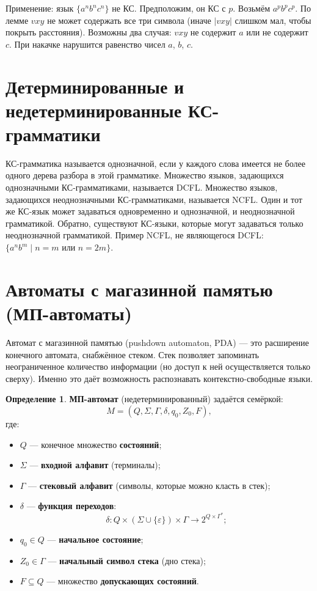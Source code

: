 \documentclass[12pt,a4paper]{article}
\theoremstyle{definition}
\newtheorem{definition}{Определение}[section]
\begin{document}
Применение: язык $\{a^n b^n c^n\}$ не КС. Предположим, он КС с $p$. Возьмём $a^p b^p c^p$. По лемме $vxy$ не может содержать все три символа (иначе $|vxy|$ слишком мал, чтобы покрыть расстояния). Возможны два случая: $vxy$ не содержит $a$ или не содержит $c$. При накачке нарушится равенство чисел $a$, $b$, $c$.

\section{Детерминированные и недетерминированные КС-грамматики}

КС-грамматика называется однозначной, если у каждого слова имеется не более одного дерева разбора в этой грамматике. Множество языков, задающихся однозначными КС-грамматиками, называется DCFL. Множество языков, задающихся неоднозначными КС-грамматиками, называется NCFL. Один и тот же КС-язык может задаваться одновременно и однозначной, и неоднозначной грамматикой. Обратно, существуют КС-языки, которые могут задаваться только неоднозначной грамматикой. Пример NCFL, не являющегося DCFL: $\{a^n b^m \mid n=m \text{ или } n=2m\}$.

\section{Автоматы с магазинной памятью (МП-автоматы)}

Автомат с магазинной памятью (pushdown automaton, PDA) — это расширение конечного автомата, снабжённое стеком. Стек позволяет запоминать неограниченное количество информации (но доступ к ней осуществляется только сверху). Именно это даёт возможность распознавать контекстно-свободные языки.

\begin{definition}
\textbf{МП-автомат} (недетерминированный) задаётся семёркой:
\[
M = (Q, \Sigma, \Gamma, \delta, q_0, Z_0, F),
\]
где:
\begin{itemize}
\item $Q$ — конечное множество \textbf{состояний};
\item $\Sigma$ — \textbf{входной алфавит} (терминалы);
\item $\Gamma$ — \textbf{стековый алфавит} (символы, которые можно класть в стек);
\item $\delta$ — \textbf{функция переходов}: 
\[
\delta: Q \times (\Sigma \cup \{\varepsilon\}) \times \Gamma \longrightarrow 2^{Q \times \Gamma^*};
\]
\item $q_0 \in Q$ — \textbf{начальное состояние};
\item $Z_0 \in \Gamma$ — \textbf{начальный символ стека} (дно стека);
\item $F \subseteq Q$ — множество \textbf{допускающих состояний}.
\end{itemize}
\end{definition}
\end{document}
